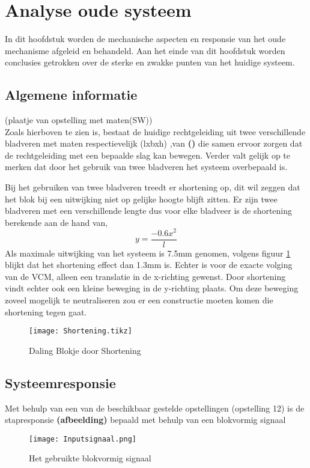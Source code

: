 \documentclass[a4paper]{article}
\begin{document}
\section{Analyse oude systeem}
In dit hoofdstuk worden de mechanische aspecten en responsie van het oude mechanisme afgeleid en behandeld. Aan het einde van dit hoofdstuk worden conclusies getrokken over de sterke en zwakke punten van het huidige systeem.

\subsection{Algemene informatie}
(plaatje van opstelling met maten(SW)) \\
Zoals hierboven te zien is, bestaat de huidige rechtgeleiding uit twee verschillende bladveren met maten respectievelijk (lxbxh) ,van \textbf{()} die samen ervoor zorgen dat de rechtgeleiding met een bepaalde slag kan bewegen. Verder valt gelijk op te merken dat door het gebruik van twee bladveren het systeem overbepaald is.

Bij het gebruiken van twee bladveren treedt er shortening op, dit wil zeggen dat het blok bij een uitwijking niet op gelijke hoogte blijft zitten. Er zijn twee bladveren met een verschillende lengte dus voor elke bladveer is de shortening berekende aan de hand van,
\begin{equation}
y=\frac{-0.6x^2}{l}
\end{equation}
Als maximale uitwijking van het systeem is 7.5mm genomen, volgens figuur \ref{Shortening} blijkt dat het shortening effect dan 1.3mm is. Echter is voor de exacte volging van de VCM, alleen een translatie in de x-richting gewenst. Door shortening vindt echter ook een kleine beweging in de y-richting plaats. Om deze beweging zoveel mogelijk te neutraliseren zou er een constructie moeten komen die shortening tegen gaat. 
\begin{figure}[h]
\label{Shortening}
\centering
\setlength\figureheight{5cm}
\setlength{}
\texttt{[image: Shortening.tikz]}
\caption{Daling Blokje door Shortening}
\end{figure}

\subsection{Systeemresponsie}
Met behulp van een van de beschikbaar gestelde opstellingen (opstelling 12) is de stapresponsie \textbf{(afbeelding)} bepaald met behulp van een blokvormig signaal
\begin{figure}[h]
  \centering
    \texttt{[image: Inputsignaal.png]}
    \caption{Het gebruikte blokvormig signaal}
\end{figure}
\end{document}
